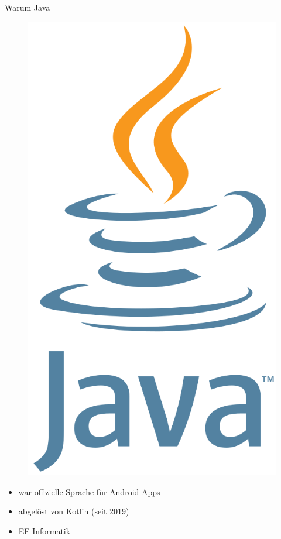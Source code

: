 \documentclass[aspectratio=169]{beamer}
\begin{document}
\begin{frame}{Warum Java}
\begin{varwidth}{.3\textwidth}
        \begin{figure}
            \centering
            \includegraphics[height=.8\textheight]{media/java-logo.png}
        \end{figure}
    \end{varwidth}
    \hfill
    \begin{varwidth}{.6\textwidth}
        \begin{itemize}\pause
            \item war offizielle Sprache für Android Apps\pause
            \item abgelöst von Kotlin (seit 2019)\pause
            \item EF Informatik
        \end{itemize}
    \end{varwidth} 
\end{frame}
\end{document}
